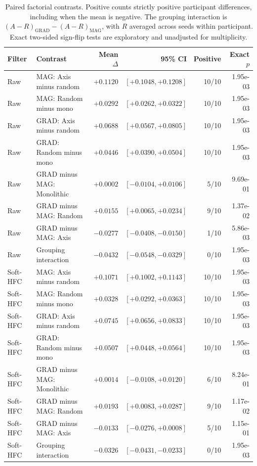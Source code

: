 \begin{table}[htbp]\centering\small
\begin{tabular}{llrrrr}
\toprule
Filter & Contrast & Mean $\Delta$ & 95\% CI & Positive & Exact $p$ \\
\midrule
Raw & MAG: Axis minus random & $+0.1120$ & $[+0.1048, +0.1208]$ & 10/10 & 1.95e-03 \\
Raw & MAG: Random minus mono & $+0.0292$ & $[+0.0262, +0.0322]$ & 10/10 & 1.95e-03 \\
Raw & GRAD: Axis minus random & $+0.0688$ & $[+0.0567, +0.0805]$ & 10/10 & 1.95e-03 \\
Raw & GRAD: Random minus mono & $+0.0446$ & $[+0.0390, +0.0504]$ & 10/10 & 1.95e-03 \\
Raw & GRAD minus MAG: Monolithic & $+0.0002$ & $[-0.0104, +0.0106]$ & 5/10 & 9.69e-01 \\
Raw & GRAD minus MAG: Random & $+0.0155$ & $[+0.0065, +0.0234]$ & 9/10 & 1.37e-02 \\
Raw & GRAD minus MAG: Axis & $-0.0277$ & $[-0.0408, -0.0150]$ & 1/10 & 5.86e-03 \\
Raw & Grouping interaction & $-0.0432$ & $[-0.0548, -0.0329]$ & 0/10 & 1.95e-03 \\
Soft-HFC & MAG: Axis minus random & $+0.1071$ & $[+0.1002, +0.1143]$ & 10/10 & 1.95e-03 \\
Soft-HFC & MAG: Random minus mono & $+0.0328$ & $[+0.0292, +0.0363]$ & 10/10 & 1.95e-03 \\
Soft-HFC & GRAD: Axis minus random & $+0.0745$ & $[+0.0656, +0.0833]$ & 10/10 & 1.95e-03 \\
Soft-HFC & GRAD: Random minus mono & $+0.0507$ & $[+0.0448, +0.0564]$ & 10/10 & 1.95e-03 \\
Soft-HFC & GRAD minus MAG: Monolithic & $+0.0014$ & $[-0.0108, +0.0120]$ & 6/10 & 8.24e-01 \\
Soft-HFC & GRAD minus MAG: Random & $+0.0193$ & $[+0.0083, +0.0287]$ & 9/10 & 1.17e-02 \\
Soft-HFC & GRAD minus MAG: Axis & $-0.0133$ & $[-0.0276, +0.0008]$ & 5/10 & 1.15e-01 \\
Soft-HFC & Grouping interaction & $-0.0326$ & $[-0.0431, -0.0233]$ & 0/10 & 1.95e-03 \\
\bottomrule\end{tabular}
\caption{Paired factorial contrasts. Positive counts strictly positive participant differences, including when the mean is negative. The grouping interaction is $(A-R)_{\mathrm{GRAD}}-(A-R)_{\mathrm{MAG}}$, with $R$ averaged across seeds within participant. Exact two-sided sign-flip tests are exploratory and unadjusted for multiplicity.}
\label{tab:s-factorial-contrasts}\end{table}

